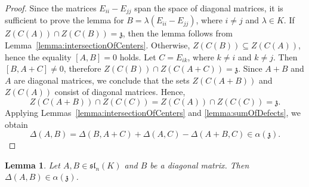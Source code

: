 \documentclass[a4paper,reqno,12pt]{amsart}
\newtheorem{lemma}[proposition]{Lemma}
\theoremstyle{definition}
\theoremstyle{remark}
\def\zzz{\mathfrak{z}}
\def\sl{\mathfrak{sl}}
\begin{document}
	\begin{proof}
		Since the matrices $E_{ii} - E_{jj}$ span the space of diagonal matrices, it is sufficient to prove the lemma for $B = \lambda (E_{ii} - E_{jj})$, where $i \neq j$ and $\lambda \in K$. If $Z(C(A)) \cap Z(C(B)) = \zzz$, then the lemma follows from Lemma~\ref{lemma:intersectionOfCenters}. Otherwise, $Z(C(B)) \subseteq Z(C(A))$, hence the equality $[A, B] = 0$ holds. Let $C = E_{ik}$, where $k \neq i$ and $k \neq j$. Then $[B, A + C] \neq 0$, therefore $Z(C(B)) \cap Z(C(A + C)) = \zzz$. Since $A + B$ and $A$ are diagonal matrices, we conclude that the sets $Z(C(A + B))$ and $Z(C(A))$ consist of diagonal matrices. Hence,
		\begin{equation*}
			Z(C(A + B)) \cap Z(C(C)) = Z(C(A)) \cap Z(C(C)) = \zzz.
		\end{equation*}
		Applying Lemmas~\ref{lemma:intersectionOfCenters} and \ref{lemma:sumOfDefects}, we obtain
		\begin{equation*}
			\Delta(A, B) = \Delta(B, A + C) + \Delta(A, C) - \Delta(A + B, C) \in \alpha(\zzz).
		\end{equation*}
	\end{proof}

	\begin{lemma}\label{lemma:almostAdditivityForDiagInSl}
		Let $A, B \in \sl_n(K)$ and $B$ be a diagonal matrix. Then $\Delta(A, B) \in \alpha(\zzz)$.
	\end{lemma}
\end{document}
